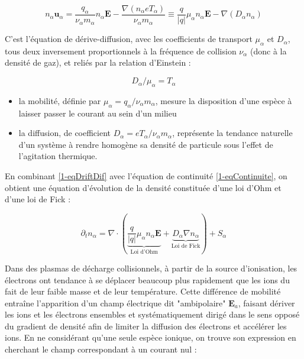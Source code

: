 \begin{refsection}
\begin{equation}
\label{1-eqDriftDif}
n_\alpha\mathbf u_\alpha=\frac{q_\alpha}{\nu_\alpha m_\alpha}n_\alpha\mathbf
E-\frac{\nabla\left(n_\alpha eT_\alpha\right)}{\nu_\alpha
m_\alpha}\equiv\frac{q}{|q|}\mu_\alpha n_\alpha\mathbf E-{\nabla\left(D_\alpha n_\alpha\right)}
\end{equation}

C'est l'équation de dérive-diffusion, avec les coefficients de
transport $\mu_\alpha$ et $D_\alpha$, tous deux
inversement proportionnels à la fréquence de collision $\nu_\alpha$ (donc à la
densité de gaz), et reliés par la relation d'Einstein :

\begin{equation}
\label{1-EinsteinRelation}
D_\alpha/\mu_\alpha=T_\alpha
\end{equation}

\begin{itemize}
  \item la mobilité, définie par $\mu_\alpha=q_\alpha/\nu_\alpha m_\alpha$,
  mesure la disposition d'une espèce à laisser passer le courant au sein d'un milieu
  \item la diffusion, de coefficient $D_\alpha=eT_\alpha/\nu_\alpha m_\alpha$,
  représente la tendance naturelle d'un système à rendre homogène sa densité de particule sous l'effet
  de l'agitation thermique.
\end{itemize}

En combinant \eqref{1-eqDriftDif} avec l'équation de continuité
\eqref{1-eqContinuite}, on obtient une équation d'évolution de la densité
constituée d'une loi d'Ohm et d'une loi de Fick :
 
\begin{equation}
\label{1-eqDriftDifContinuite}
\partial_t n_\alpha=\nabla\cdot(\underbrace{\frac{q}{|q|}\mu_\alpha n_\alpha\mathbf
E}_\text{Loi d'Ohm}+\underbrace{D_\alpha{\nabla n_\alpha}}_\text{Loi
de Fick})+S_\alpha
\end{equation}

Dans des plasmas de décharge collisionnels, à partir de la source d'ionisation,
les électrons ont tendance à se déplacer beaucoup plus rapidement que les ions
du fait de leur faible masse et de leur température. Cette différence de
mobilité entraîne l'apparition d'un champ électrique dit "ambipolaire"
$\mathbf E_a$, faisant dériver les ions et les électrons ensembles et
systématiquement dirigé dans le sens opposé du gradient de densité afin de
limiter la diffusion des électrons et accélérer les ions. En ne considérant
qu'une seule espèce ionique, on trouve son expression en cherchant le champ
correspondant à un courant nul :
 

\end{refsection}
